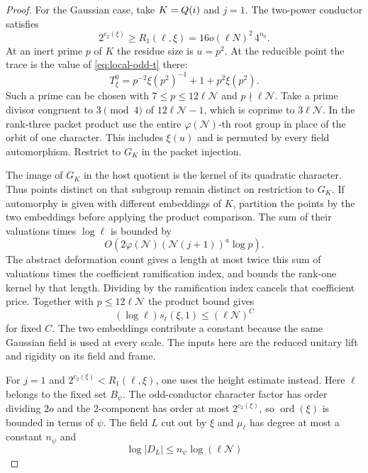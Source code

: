 \begin{proof}

For the Gaussian case, take \(K=Q(i)\) and \(j=1\).
The two-power conductor satisfies
\[
 2^{c_2(\xi)}\ge R_1(\ell,\xi)
       =16o(\ell N)^2\,4^{n_0}.
\]
At an inert prime \(p\) of \(K\) the residue size is \(u=p^2\).
At the reducible point the trace is the value of \eqref{eq:local-odd-t} there:
\[
          T^0_\xi=p^{-2}\xi(p^2)^{-1}+1+p^2\xi(p^2).
\]
Such a prime can be chosen with \(7\le p\le12\ell\mathcal N\)
and \(p\nmid\ell\mathcal N\). Take a prime divisor congruent
to \(3\pmod4\) of \(12\ell\mathcal N-1\), which is coprime
to \(3\ell\mathcal N\).
In the rank-three packet product use the entire
\(\varphi(\mathcal N)\)-th root group in place of the orbit
of one character. This includes \(\xi(u)\) and is permuted
by every field automorphism. Restrict to \(G_K\) in the
packet injection.

The image of \(G_K\) in the host quotient
is the kernel of its quadratic character. Thus points
distinct on that subgroup remain distinct on restriction
to \(G_K\). If automorphy is given with different
embeddings of \(K\), partition the points by the two
embeddings before applying the product comparison. The
sum of their valuations times \(\log\ell\) is bounded by
\[
      O\!\left(2\varphi(\mathcal N)
                  (\mathcal N(j+1))^a\log p\right).
\]
The abstract deformation count gives a length at most
twice this sum of valuations times the coefficient
ramification index, and bounds the rank-one kernel by
that length. Dividing by the ramification index cancels that coefficient price.
Together with \(p\le12\ell\mathcal N\) the product bound gives
\[
       (\log\ell)s_\ell(\xi,1)\le(\ell\mathcal N)^C
\]
for fixed \(C\). The two embeddings contribute a
constant because the same Gaussian field is used at every
scale. The inputs here are the reduced unitary lift and rigidity on its field and frame. \label{cor:ordinary-odd-primes-8}

For \(j=1\) and \(2^{c_2(\xi)}< R_1(\ell,\xi)\),
one uses the height estimate instead. Here \(\ell\) belongs
to the fixed set \(B_\psi\). The odd-conductor character
factor has order dividing \(2o\) and the 2-component
has order at most \(2^{c_2(\xi)}\), so \(\operatorname{ord}(\xi)\)
is bounded in terms of \(\psi\). The field \(L\) cut out
by \(\xi\) and \(\mu_\ell\) has degree at most a constant
\(n_\psi\) and
\[
 \log |D_L|\le n_\psi\log(\ell\mathcal N)
\]


\end{proof}
